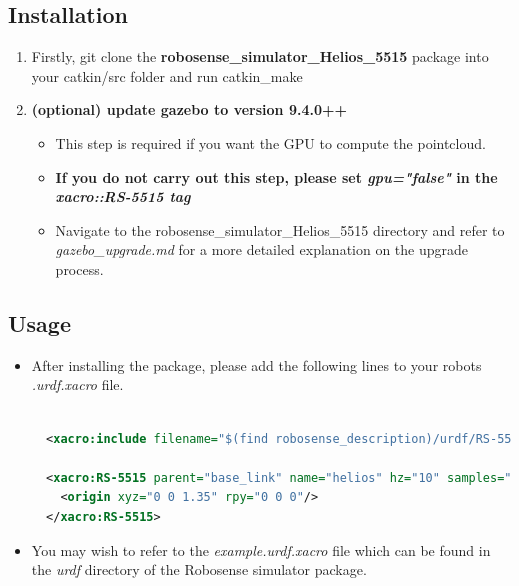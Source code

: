 \documentclass[11pt]{article}
\begin{document}
\subsection{Installation}
\begin{enumerate}
 \item {Firstly, git clone the \textbf{robosense\_simulator\_Helios\_5515} package into your catkin/src folder and run catkin\_make}
 \item{
       \textbf{(optional) update gazebo to version 9.4.0++}
       
       \begin{itemize}
        \item { This step is required if you want the GPU to compute the pointcloud.}
        \item {
              \textbf{If you do not carry out this step, please set \emph{gpu="false"} in the \emph{xacro::RS-5515 tag}
              }
              
              }
        \item{
              Navigate to the robosense\_simulator\_Helios\_5515 directory and refer to \emph{gazebo\_upgrade.md} for a more detailed explanation on the upgrade process.
              }
       \end{itemize}
       }
\end{enumerate}
\subsection{Usage}
\begin{itemize}
 \item {
       After installing the package, please add the following lines to your robots \emph{.urdf.xacro} file.
       \begin{lstlisting}[language=xml]

  <xacro:include filename="$(find robosense_description)/urdf/RS-5515.urdf.xacro"/>

  <xacro:RS-5515 parent="base_link" name="helios" hz="10" samples="1800" gpu="true" noise="0.002">
    <origin xyz="0 0 1.35" rpy="0 0 0"/>
  </xacro:RS-5515>
\end{lstlisting}
       }
 \item{
       You may wish to refer to the \emph{example.urdf.xacro} file which can be found in the \emph{urdf} directory of the Robosense simulator package.
       
       }
\end{itemize}
\end{document}
